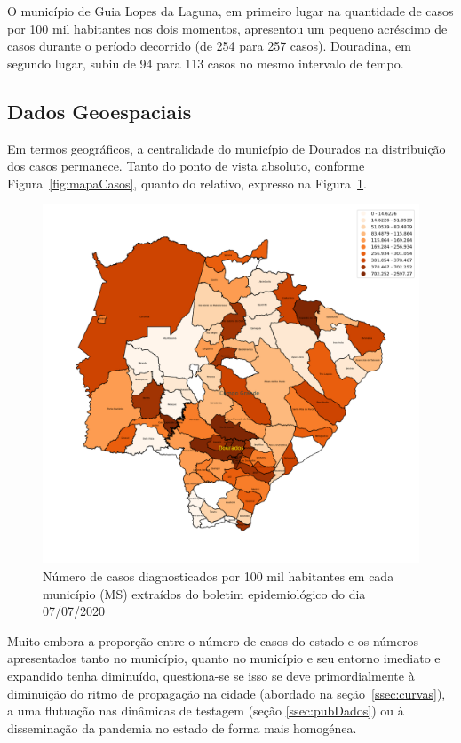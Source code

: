 \documentclass[12pt]{article}
\begin{document}
O município de Guia Lopes da Laguna, em primeiro lugar na quantidade de casos por 100 mil habitantes nos dois momentos, apresentou um pequeno acréscimo de casos durante o período decorrido (de 254 para 257 casos). Douradina, em segundo lugar, subiu de 94 para 113 casos no mesmo intervalo de tempo. 

\subsection{Dados Geoespaciais}\label{ssec:geo}

Em termos geográficos, a centralidade do município de Dourados na distribuição dos casos permanece. Tanto do ponto de vista absoluto, conforme Figura~\ref{fig:mapaCasos}, quanto do relativo, expresso na Figura~\ref{fig:mapa100K}.

\begin{figure}[!htb]
  \centering
  \includegraphics[width=.8\textwidth]{figs/mapa_casos_100_mil.png}
  \caption{Número de casos diagnosticados por 100 mil habitantes em cada município (MS) extraídos do boletim epidemiológico do dia 07/07/2020}
  \label{fig:mapa100K}
  \end{figure}

Muito embora a proporção entre o número de casos do estado e os números apresentados tanto no município, quanto no município e seu entorno imediato e expandido tenha diminuído, questiona-se se isso se deve primordialmente à diminuição do ritmo de propagação na cidade (abordado na seção~\ref{ssec:curvas}), a uma flutuação nas dinâmicas de testagem (seção \ref{ssec:pubDados}) ou à disseminação da pandemia no estado de forma mais homogénea.
\end{document}
